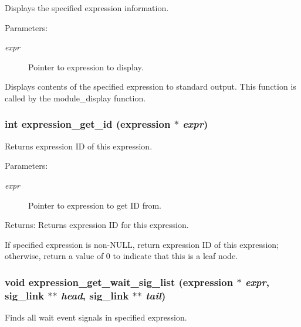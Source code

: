 Displays the specified expression information. 

\begin{Desc}
\item[Parameters:]
\begin{description}
\item[{\em expr}]Pointer to expression to display.\end{description}
\end{Desc}
Displays contents of the specified expression to standard output. This function is called by the module\_\-display function. 
\subsubsection{\setlength{\rightskip}{0pt plus 5cm}int expression\_\-get\_\-id ({\bf expression} $\ast$ {\em expr})}\label{expr_8h_a4}


Returns expression ID of this expression. 

\begin{Desc}
\item[Parameters:]
\begin{description}
\item[{\em expr}]Pointer to expression to get ID from. \end{description}
\end{Desc}
\begin{Desc}
\item[Returns:]Returns expression ID for this expression.\end{Desc}
If specified expression is non-NULL, return expression ID of this expression; otherwise, return a value of 0 to indicate that this is a leaf node. 
\subsubsection{\setlength{\rightskip}{0pt plus 5cm}void expression\_\-get\_\-wait\_\-sig\_\-list ({\bf expression} $\ast$ {\em expr}, {\bf sig\_\-link} $\ast$$\ast$ {\em head}, {\bf sig\_\-link} $\ast$$\ast$ {\em tail})}\label{expr_8h_a5}


Finds all wait event signals in specified expression. 

